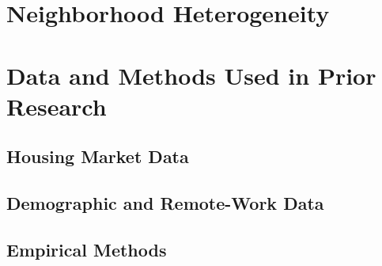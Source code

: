 \documentclass[11pt]{article}
\begin{document}
\section{Neighborhood Heterogeneity}

%
%
%
%
%


\section{Data and Methods Used in Prior Research}



\subsection{Housing Market Data}

%
%
%


\subsection{Demographic and Remote-Work Data}

%


\subsection{Empirical Methods}
\end{document}
